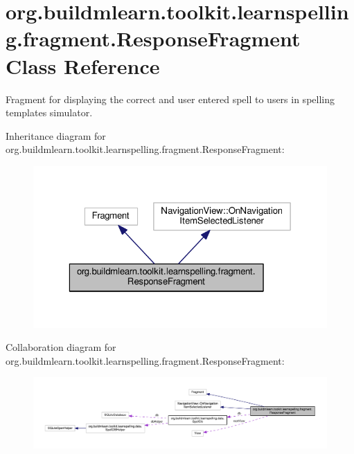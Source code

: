 \hypertarget{classorg_1_1buildmlearn_1_1toolkit_1_1learnspelling_1_1fragment_1_1ResponseFragment}{}\section{org.\+buildmlearn.\+toolkit.\+learnspelling.\+fragment.\+Response\+Fragment Class Reference}
\label{classorg_1_1buildmlearn_1_1toolkit_1_1learnspelling_1_1fragment_1_1ResponseFragment}


Fragment for displaying the correct and user entered spell to users in spelling template\textquotesingle{}s simulator.  




Inheritance diagram for org.\+buildmlearn.\+toolkit.\+learnspelling.\+fragment.\+Response\+Fragment\+:
\nopagebreak
\begin{figure}[H]
\begin{center}
\leavevmode
\includegraphics[width=323pt]{classorg_1_1buildmlearn_1_1toolkit_1_1learnspelling_1_1fragment_1_1ResponseFragment__inherit__graph}
\end{center}
\end{figure}


Collaboration diagram for org.\+buildmlearn.\+toolkit.\+learnspelling.\+fragment.\+Response\+Fragment\+:
\nopagebreak
\begin{figure}[H]
\begin{center}
\leavevmode
\includegraphics[width=350pt]{classorg_1_1buildmlearn_1_1toolkit_1_1learnspelling_1_1fragment_1_1ResponseFragment__coll__graph}
\end{center}
\end{figure}
